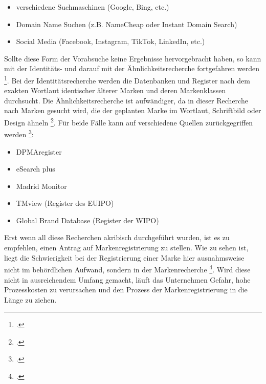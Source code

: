 \begin{itemize}
    \item verschiedene Suchmaschinen (Google, Bing, etc.)
    \item Domain Name Suchen (z.B. NameCheap oder Instant Domain Search)
    \item Social Media (Facebook, Instagram, TikTok, LinkedIn, etc.)
\end{itemize}
    
Sollte diese Form der Vorabsuche keine Ergebnisse hervorgebracht haben, so kann mit der Identitäts- und darauf mit der Ähnlichkeitsrecherche fortgefahren werden \footcite{plutte_markenrecherche_2015}. Bei der Identitätsrecherche werden die Datenbanken und Register nach dem exakten Wortlaut identischer älterer Marken und deren Markenklassen durchsucht. Die Ähnlichkeitsrecherche ist aufwändiger, da in dieser Recherche nach Marken gesucht wird, die der geplanten Marke im Wortlaut, Schriftbild oder Design ähneln \footcite{plutte_markenrecherche_2015}. Für beide Fälle kann auf verschiedene Quellen zurückgegriffen werden \footcite{oa_dpma_nodate-1}: 

\begin{itemize}
    \item DPMAregister
    \item eSearch plus
    \item Madrid Monitor
    \item TMview (Register des EUIPO)
    \item Global Brand Database (Register der WIPO)
\end{itemize}

Erst wenn all diese Recherchen akribisch durchgeführt wurden, ist es zu empfehlen, einen Antrag auf Markenregistrierung zu stellen. Wie zu sehen ist, liegt die Schwierigkeit bei der Registrierung einer Marke hier ausnahmsweise nicht im behördlichen Aufwand, sondern in der Markenrecherche \footcite{wolking_-_2007}. Wird diese nicht in ausreichendem Umfang gemacht, läuft das Unternehmen Gefahr, hohe Prozesskosten zu verursachen und den Prozess der Markenregistrierung in die Länge zu ziehen.